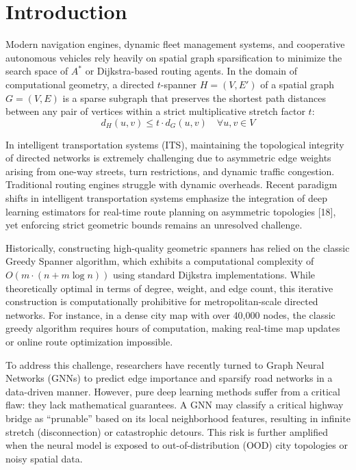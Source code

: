 \documentclass[journal]{IEEEtran}
\begin{document}
\section{Introduction}
Modern navigation engines, dynamic fleet management systems, and cooperative autonomous vehicles rely heavily on spatial graph sparsification to minimize the search space of $A^*$ or Dijkstra-based routing agents. In the domain of computational geometry, a directed $t$-spanner $H = (V, E')$ of a spatial graph $G = (V, E)$ is a sparse subgraph that preserves the shortest path distances between any pair of vertices within a strict multiplicative stretch factor $t$:
\begin{equation}
    d_H(u, v) \le t \cdot d_G(u, v) \quad \forall u, v \in V
\end{equation}

In intelligent transportation systems (ITS), maintaining the topological integrity of directed networks is extremely challenging due to asymmetric edge weights arising from one-way streets, turn restrictions, and dynamic traffic congestion. Traditional routing engines struggle with dynamic overheads. Recent paradigm shifts in intelligent transportation systems emphasize the integration of deep learning estimators for real-time route planning on asymmetric topologies [18], yet enforcing strict geometric bounds remains an unresolved challenge.

Historically, constructing high-quality geometric spanners has relied on the classic Greedy Spanner algorithm, which exhibits a computational complexity of $O(m \cdot (n + m \log n))$ using standard Dijkstra implementations. While theoretically optimal in terms of degree, weight, and edge count, this iterative construction is computationally prohibitive for metropolitan-scale directed networks. For instance, in a dense city map with over 40,000 nodes, the classic greedy algorithm requires hours of computation, making real-time map updates or online route optimization impossible.

To address this challenge, researchers have recently turned to Graph Neural Networks (GNNs) to predict edge importance and sparsify road networks in a data-driven manner. However, pure deep learning methods suffer from a critical flaw: they lack mathematical guarantees. A GNN may classify a critical highway bridge as ``prunable'' based on its local neighborhood features, resulting in infinite stretch (disconnection) or catastrophic detours. This risk is further amplified when the neural model is exposed to out-of-distribution (OOD) city topologies or noisy spatial data.
\end{document}

